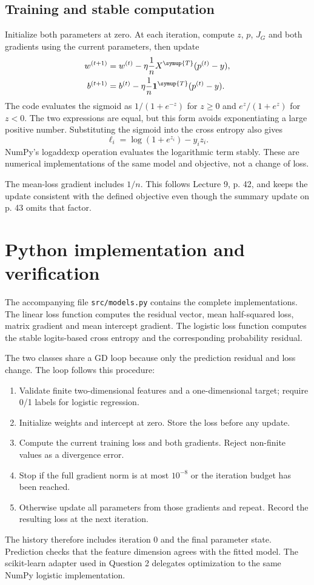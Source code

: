 \subsection{Training and stable computation}
Initialize both parameters at zero. At each iteration, compute $z$, $p$, $J_G$ and both gradients using the current parameters, then update
\[
\begin{aligned}
w^{(t+1)}&=w^{(t)}-\eta\frac1nX^{\symup{T}}(p^{(t)}-y),\\
b^{(t+1)}&=b^{(t)}-\eta\frac1n\mathbf1^{\symup{T}}(p^{(t)}-y).
\end{aligned}
\]
The code evaluates the sigmoid as $1/(1+e^{-z})$ for $z\ge0$ and $e^z/(1+e^z)$ for $z<0$. The two expressions are equal, but this form avoids exponentiating a large positive number. Substituting the sigmoid into the cross entropy also gives
\[
\ell_i=\log(1+e^{z_i})-y_iz_i.
\]
NumPy's logaddexp operation evaluates the logarithmic term stably. These are numerical implementations of the same model and objective, not a change of loss.

The mean-loss gradient includes $1/n$. This follows Lecture 9, p. 42, and keeps the update consistent with the defined objective even though the summary update on p. 43 omits that factor.


\section{Python implementation and verification}
The accompanying file \texttt{src/models.py} contains the complete implementations. The linear loss function computes the residual vector, mean half-squared loss, matrix gradient and mean intercept gradient. The logistic loss function computes the stable logits-based cross entropy and the corresponding probability residual.

The two classes share a GD loop because only the prediction residual and loss change. The loop follows this procedure:
\begin{enumerate}
\item Validate finite two-dimensional features and a one-dimensional target; require 0/1 labels for logistic regression.
\item Initialize weights and intercept at zero. Store the loss before any update.
\item Compute the current training loss and both gradients. Reject non-finite values as a divergence error.
\item Stop if the full gradient norm is at most $10^{-8}$ or the iteration budget has been reached.
\item Otherwise update all parameters from those gradients and repeat. Record the resulting loss at the next iteration.
\end{enumerate}
The history therefore includes iteration 0 and the final parameter state. Prediction checks that the feature dimension agrees with the fitted model. The scikit-learn adapter used in Question 2 delegates optimization to the same NumPy logistic implementation.

